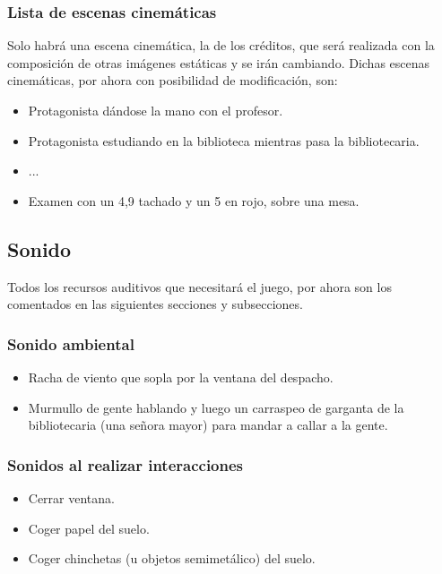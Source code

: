             \subsubsection{Lista de escenas cinemáticas}
            Solo habrá una escena cinemática, la de los créditos, que será realizada con la composición de otras imágenes estáticas y se irán cambiando. Dichas escenas cinemáticas, por ahora con posibilidad de modificación, son:
            \begin{itemize}
            \item Protagonista dándose la mano con el profesor.
            \item Protagonista estudiando en la biblioteca mientras pasa la bibliotecaria.
            \item ...
            \item Examen con un 4,9 tachado y un 5 en rojo, sobre una mesa.
            \end{itemize}
            
        \subsection{Sonido}
        Todos los recursos auditivos que necesitará el juego, por ahora son los comentados en las siguientes secciones y subsecciones.
            \subsubsection{Sonido ambiental}
            \begin{itemize}
            \item Racha de viento que sopla por la ventana del despacho.
            \item Murmullo de gente hablando y luego un carraspeo de garganta de la bibliotecaria (una señora mayor) para mandar a callar a la gente.
            \end{itemize}
            \subsubsection{Sonidos al realizar interacciones}
            \begin{itemize}
            \item Cerrar ventana.
            \item Coger papel del suelo.
            \item Coger chinchetas (u objetos semimetálico) del suelo.
            \end{itemize}

